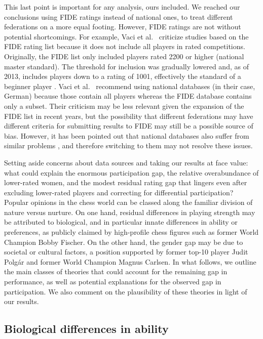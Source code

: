 \documentclass[9pt,twocolumn,twoside,lineno]{pnas-new}
\begin{document}
This last point is important for any analysis, ours included. We reached our conclusions using FIDE ratings instead of national ones, to treat different federations on a more equal footing. However, FIDE ratings are not without potential shortcomings. For example, Vaci et al.~\cite{vacigulabilalic} criticize studies based on the FIDE rating list because it does not include all players in rated competitions. Originally, the FIDE list only included players rated 2200 or higher (national master standard). The threshold for inclusion was gradually lowered and, as of 2013, includes players down to a rating of 1001, effectively the standard of a beginner player \cite{wiesend2019questioning}. Vaci et al.~\cite{vacigulabilalic} recommend using national databases (in their case, German) because those contain all players whereas the FIDE database contains only a subset. Their criticism may be less relevant given the expansion of the FIDE list in recent years, but the possibility that different federations may have different criteria for submitting results to FIDE may still be a possible source of bias. However, it has been pointed out that national databases also suffer from similar problems \cite{wiesend2019questioning}, and therefore switching to them may not resolve these issues.

Setting aside concerns about data sources and taking our results at face value: what could explain the enormous participation gap, the relative overabundance of lower-rated women, and the modest residual rating gap that lingers even after excluding lower-rated players and correcting for differential participation? Popular opinions in the chess world can be classed along the familiar division of nature versus nurture. On one hand, residual differences in playing strength may be attributed to biological, and in particular innate differences in ability or preferences, as publicly claimed by high-profile chess figures such as former World Champion Bobby Fischer. On the other hand, the gender gap may be due to societal or cultural factors, a position supported by former top-10 player Judit Polgár and former World Champion Magnus Carlsen. In what follows, we outline the main classes of theories that could account for the remaining gap in performance, as well as potential explanations for the observed gap in participation. We also comment on the plausibility of these theories in light of our results.


\subsection*{Biological differences in ability}
\end{document}
